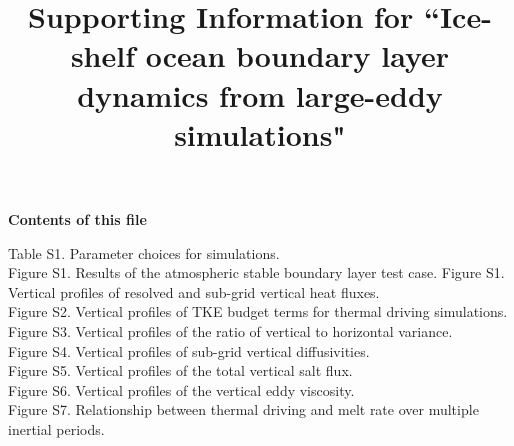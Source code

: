 \documentclass[tc, manuscript]{copernicus}
\begin{document}
\title{Supporting Information for ``Ice-shelf ocean boundary layer dynamics from large-eddy simulations"}







\maketitle

\noindent\textbf{Contents of this file}

\noindent
Table S1. Parameter choices for simulations.\\
Figure S1. Results of the atmospheric stable boundary layer test case.
Figure S1. Vertical profiles of resolved and sub-grid vertical heat fluxes.\\
Figure S2. Vertical profiles of TKE budget terms for thermal driving simulations.\\
Figure S3. Vertical profiles of the ratio of vertical to horizontal variance.\\
Figure S4. Vertical profiles of sub-grid vertical diffusivities.\\
Figure S5. Vertical profiles of the total vertical salt flux.\\
Figure S6. Vertical profiles of the vertical eddy viscosity.\\
Figure S7. Relationship between thermal driving and melt rate over multiple inertial periods. 

\clearpage
\end{document}
